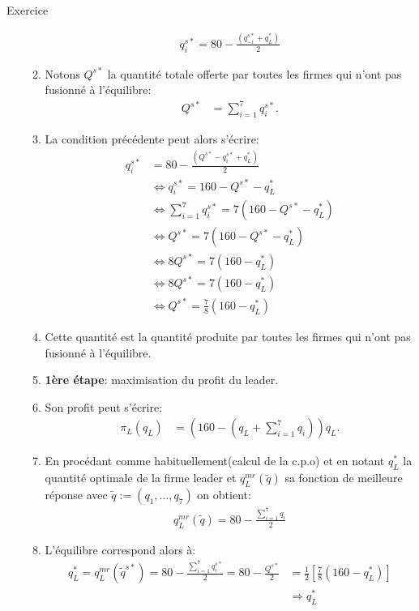 \begin{frame}[allowframebreaks]{Exercice}
\begin{enumerate}
\begin{enumerate}[$\star$]
             \begin{align*}
                q_i^{s*} = 80 - \frac{(q_{-i}^{s*} + q_L^*)}{2} 
             \end{align*}
            \item Notons $Q^{s*}$ la quantité totale offerte par toutes les firmes 
            qui n'ont pas fusionné à l'équilibre: 
            \begin{align*}
                Q^{s*} &= \sum_{i=1}^7 q_i^{s*}.
            \end{align*}
            \item La condition précédente peut alors s'écrire:
            \begin{align*}
                q_i^{s*} &= 80 - \frac{(Q^{s*} - q_i^{s*} + q_L^*)}{2} \\
                &\Leftrightarrow  q_i^{s*} = 160 - Q^{s*} - q_L^* \\
                &\Leftrightarrow \sum_{i=1}^7 q_i^{s*} = 7(160 - Q^{s*} - q_L^* )\\
                &\Leftrightarrow  Q^{s*} = 7(160 - Q^{s*} - q_L^* )\\
                &\Leftrightarrow 8Q^{s*} = 7(160 - q_L^*)\\
                &\Leftrightarrow 8Q^{s*} = 7(160 - q_L^*)\\
                &\Leftrightarrow Q^{s*} = \frac{7}{8}(160 - q_L^*)
             \end{align*}
             \item Cette quantité est la quantité produite par toutes les firmes qui n'ont pas 
             fusionné à l'équilibre. 
             \item \textbf{1ère étape}: maximisation du profit du leader. 
             \item Son profit peut s'écrire:
             \begin{align*}
                 \pi_L(q_L) &= (160 - (q_L + \sum_{i=1}^7 q_i))q_L.
             \end{align*}
             \item En procédant comme habituellement(calcul de la c.p.o) et en notant $q_L^*$ la quantité optimale 
             de la firme leader et $q^{mr}_L(\tilde{q})$ sa fonction de meilleure réponse avec $\tilde{q}:=(q_1, \ldots, q_7)$ on obtient: 
             \begin{align*}
              q^{mr}_L(\tilde{q}) = 80 - \frac{\sum_{i=1}^7 q_i}{2}
             \end{align*}
             \item L'équilibre correspond alors à:
             \begin{align*}
               q_L^* = q^{mr}_L(\tilde{q}^{s*}) = 80 - \frac{\sum_{i=1}^7 q_i^{s*}}{2} = 80 - \frac{Q^{s*}}{2}&=\frac{1}{2}\left[ \frac{7}{8}(160 - q_L^*)\right]\\
               &\Rightarrow q_L^* 
            \end{align*}


\end{enumerate}
\end{enumerate}
\end{frame}
